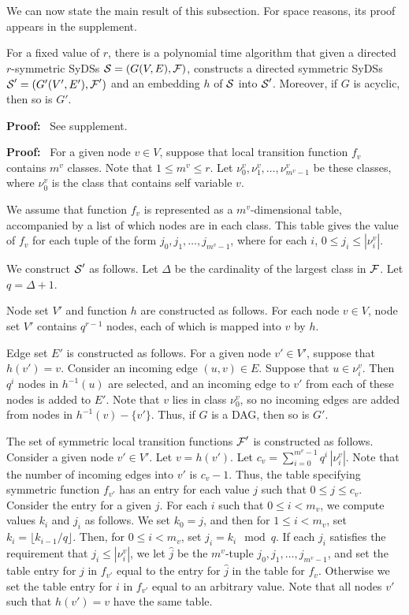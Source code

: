 We can now state the main result of this subsection.
For space reasons, its proof appears in the supplement.

\begin{theorem}\label{thm:r_symmetric_directed}
For a fixed value of $r$, there is a polynomial time algorithm that
given a directed $r$-symmetric SyDSs $\mbox{$\mathcal{S}$} = (G(V,E), \mbox{$\mathcal{F}$})$,
constructs a directed symmetric SyDSs $\mbox{$\mathcal{S}$}' = (G'(V',E'), \mbox{$\mathcal{F}$}')$
and an embedding $h$ of $\mbox{$\mathcal{S}$}$ into $\mbox{$\mathcal{S}$}'$.  Moreover, if  $G$
is acyclic, then so is $G'$.  
\end{theorem}

\noindent
\textbf{Proof:}~ See supplement.

\iffalse
\noindent
\textbf{Proof:}~ 
For a given node $v \in V$, 
suppose that local transition function $f_v$ contains $m^v$ classes.
Note that $1 \leq m^v \leq r$.
Let $\nu_0^v, \nu_1^v, \ldots ,\nu_{m^v-1}^v$ be these classes,
where $\nu_0^v$ is the class that contains self variable $v$.

We assume that function $f_v$  is represented 
as a $m^v$-dimensional table,
accompanied by a list of which nodes are in each class.
This table gives the value of $f_v$ for each tuple
of the form $j_0,  j_1, \ldots , j_{m^v -1}$,
where for each $i$, $0 \leq j_i \leq |\nu_i^v|$.

We construct $\mbox{$\mathcal{S}$}'$ as follows.
Let $\Delta$ be the cardinality of the largest class in $\mbox{$\mathcal{F}$}$.
Let $q =  \Delta + 1$.

Node set $V'$ and function $h$ are constructed as follows.
For each node $v \in V$,
node set $V'$ contains $q^{r-1}$ nodes, each of which is mapped into $v$ by $h$.

 Edge set $E'$ is constructed as follows.
For a given node $v' \in V'$,
suppose that $h(v') = v$.
Consider an incoming edge $(u,v) \in E$.
Suppose that $u \in \nu_i^v$.
Then $q^i$ nodes in $h^{-1}(u)$ are selected,
and an incoming edge to $v'$ from each of these nodes is added to $E'$.
Note that $v$  lies in class  $\nu_0^v$,
so no incoming edges are added from nodes in $h^{-1}(v) - \{v'\}$.
Thus, if $G$ is a DAG, then so is $G'$.

The set of symmetric local transition functions $\mbox{$\mathcal{F}$}'$ is constructed as follows.
Consider a given node $v' \in V'$. Let $v = h(v')$.
Let $c_v = \sum_{i=0}^{m^v-1} q^i \, |\nu_i^v|$.
Note that the number of incoming edges into $v'$ is 
$c_v -1$.
Thus, the table specifying symmetric function $f_{v'}$
has an entry for each value $j$ such that $0 \leq j \leq c_v$.
Consider the entry for a given $j$.
For each $i$ such that $0 \leq i < m_v$,
we compute values $k_i$ and $j_i$ as follows.
We set $k_0 =j$, and then for $1 \leq i < m_v$,
set $k_i = \lfloor k_{i-1}/q \rfloor$.
Then, for $0 \leq i < m_v$, set $j_i = k_i \mod q$.
If each $j_i$ satisfies the requirement that $j_i \leq | \nu_i^v |$,
we let $\hat{j}$ be the $m^v$-tuple $j_0,  j_1, \ldots , j_{m^v -1}$,
and set the table entry for $j$ in $f_{v'}$ equal to the entry for $\hat{j}$ 
 in the table for $f_v$.
Otherwise we set the table entry for $i$ in $f_{v'}$ equal to an arbitrary value.
Note that all nodes $v'$ such that $h(v')=v$ have the same table.

